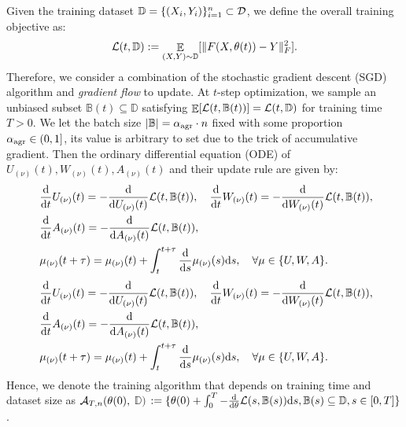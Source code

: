 \documentclass[11pt]{article}
\theoremstyle{plain}
\renewcommand{\d}{\mathrm{d}}
\DeclareMathOperator*{\E}{{\mathbb{E}}}
\begin{document}
Given the training dataset $\mathbb{D} = \{(X_i, Y_i)\}_{i=1}^n \subset {\cal D}$, we define the overall training objective as:
\begin{align*}
    {\cal L}(t, \mathbb{D}) := \E_{ (X, Y) \sim \mathbb{D} } [ \| F(X, \theta(t)) - Y \|_F^2].
\end{align*}
Therefore, we consider a combination of the stochastic gradient descent (SGD) algorithm and {\it gradient flow} to update. At $t$-step optimization, we sample an unbiased subset $\mathbb{B}(t) \subseteq \mathbb{D}$ satisfying $\E[{\cal L}(t, \mathbb{B}(t))] = {\cal L}(t, \mathbb{D})$
for training time $T > 0$. We let the batch size $|\mathbb{B}|= {\alpha}_{\rm agr} \cdot n$ fixed with some proportion ${\alpha}_{\rm agr} \in (0, 1]$, its value is arbitrary to set due to the trick of accumulative gradient.
Then the ordinary differential equation (ODE) of $U_{(\nu)}(t), W_{(\nu)}(t), A_{(\nu)}(t)$ and their update rule are given by:
\ifdefined\isarxiv
\begin{align}\label{eq:ODE_update}
    \begin{split}
        & ~ \frac{\d}{\d t}U_{(\nu)}(t) = - \frac{\d }{\d U_{(\nu)}(t)} {\cal L}(t, \mathbb{B}(t)), \quad \frac{\d}{\d t}W_{(\nu)}(t) = - \frac{\d }{\d W_{(\nu)}(t)} {\cal L}(t, \mathbb{B}(t)),  \\
        & ~ \frac{\d}{\d t}A_{(\nu)}(t) = - \frac{\d }{\d A_{(\nu)}(t)} {\cal L}(t, \mathbb{B}(t)), \\
        & ~ \mu_{(\nu)}(t + \tau) = \mu_{(\nu)}(t) + \int_{t}^{t+\tau} \frac{\d}{\d s}\mu_{(\nu)}(s) \d s,\quad \forall \mu \in \{U, W, A\}.
    \end{split}
\end{align}
\else
\begin{align}\label{eq:ODE_update}
    \begin{split}
        & ~ \frac{\d}{\d t}U_{(\nu)}(t) = - \frac{\d }{\d U_{(\nu)}(t)} {\cal L}(t, \mathbb{B}(t)), \quad \frac{\d}{\d t}W_{(\nu)}(t) = - \frac{\d }{\d W_{(\nu)}(t)} {\cal L}(t, \mathbb{B}(t)),  \\
        & ~ \frac{\d}{\d t}A_{(\nu)}(t) = - \frac{\d }{\d A_{(\nu)}(t)} {\cal L}(t, \mathbb{B}(t)), \\
        & ~ \mu_{(\nu)}(t + \tau) = \mu_{(\nu)}(t) + \int_{t}^{t+\tau} \frac{\d}{\d s}\mu_{(\nu)}(s) \d s,\quad \forall \mu \in \{U, W, A\}.
    \end{split}
\end{align}
\fi
Hence, we denote the training algorithm that depends on training time and dataset size as ${\cal A}_{T, n}(\theta(0), $ $ \mathbb{D})$ $ := \{ \theta(0) +\int_{0}^T - \frac{\d}{\d \theta} {\cal L}(s, \mathbb{B}(s)) \d s, \mathbb{B}(s) \subseteq \mathbb{D}, s\in [0, T]  \}$.%
\end{document}
